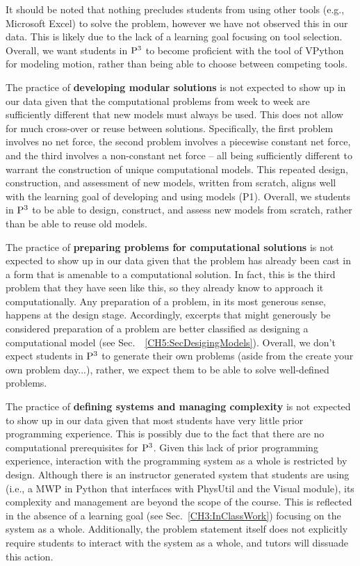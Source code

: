 \documentclass{msuphddissertation}
\begin{document}
\begin{doublespace}
It should be noted that nothing precludes students from using other tools (e.g., Microsoft Excel) to solve the problem, however we have not observed this in our data.  This is likely due to the lack of a learning goal focusing on tool selection.  Overall, we want students in ${\rm P}^{3}$ to become proficient with the tool of VPython for modeling motion, rather than being able to choose between competing tools.

The practice of \textbf{developing modular solutions} is not expected to show up in our data given that the computational problems from week to week are sufficiently different that new models must always be used.  This does not allow for much cross-over or reuse between solutions.  Specifically, the first problem involves no net force, the second problem involves a piecewise constant net force, and the third involves a non-constant net force -- all being sufficiently different to warrant the construction of unique computational models.  This repeated design, construction, and assessment of new models, written from scratch, aligns well with the learning goal of developing and using models (P1).  Overall, we students in ${\rm P}^{3}$ to be able to design, construct, and assess new models from scratch, rather than be able to reuse old models.

The practice of \textbf{preparing problems for computational solutions} is not expected to show up in our data given that the problem has already been cast in a form that is amenable to a computational solution.  In fact, this is the third problem that they have seen like this, so they already know to approach it computationally.  Any preparation of a problem, in its most generous sense, happens at the design stage.  Accordingly, excerpts that might generously be considered preparation of a problem are better classified as designing a computational model (see Sec.~~\ref{CH5:SecDesigingModels}).  Overall, we don't expect students in ${\rm P}^{3}$ to generate their own problems (aside from the create your own problem day...), rather, we expect them to be able to solve well-defined problems.

The practice of \textbf{defining systems and managing complexity} is not expected to show up in our data given that most students have very little prior programming experience.  This is possibly due to the fact that there are no computational prerequisites for ${\rm P}^{3}$.  Given this lack of prior programming experience, interaction with the programming system as a whole is restricted by design.  Although there is an instructor generated system that students are using (i.e., a MWP in Python that interfaces with PhysUtil and the Visual module), its complexity and management are beyond the scope of the course.  This is reflected in the absence of a learning goal (see Sec.~\ref{CH3:InClassWork}) focusing on the system as a whole.  Additionally, the problem statement itself does not explicitly require students to interact with the system as a whole, and tutors will dissuade this action.


\end{doublespace}
\end{document}
